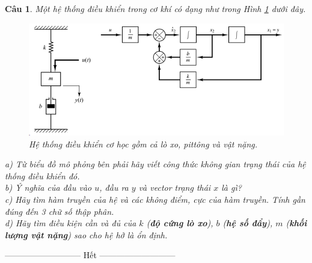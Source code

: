 \documentclass[11pt]{article}
\newtheorem{bt}{Câu}
\begin{document}
\begin{bt}\label{Câu 1}
	Một hệ thống điều khiển trong cơ khí có dạng như trong Hình \ref{fig:mechanicalsystem} dưới đây. 
	
	\begin{figure}[!h]
		\centering
		\includegraphics[width=0.7\linewidth]{Mechanical_System}
		\caption[Hệ thống điều khiển cơ học]{Hệ thống điều khiển cơ học gồm cả lò xo, pittông và vật nặng.}
		\label{fig:mechanicalsystem}
	\end{figure}
	
	a) Từ biểu đồ mô phỏng bên phải hãy viết công thức không gian trạng thái của hệ thống điều khiển đó. \\
	b) Ý nghĩa của đầu vào $u$, đầu ra $y$ và vector trạng thái $x$ là gì? \\
	c) Hãy tìm hàm truyền của hệ và các không điểm, cực của hàm truyền. Tính gần đúng đến 3 chữ số thập phân. \\
	d) Hãy tìm điều kiện cần và đủ của $k$ (\textbf{độ cứng lò xo}), $b$ (\textbf{hệ số đẩy}), $m$ (\textbf{khối lượng vật nặng}) sao cho hệ hở là ổn định.
\end{bt}


\begin{center}
	--------------------------- Hết ---------------------------
\end{center}
\end{document}

